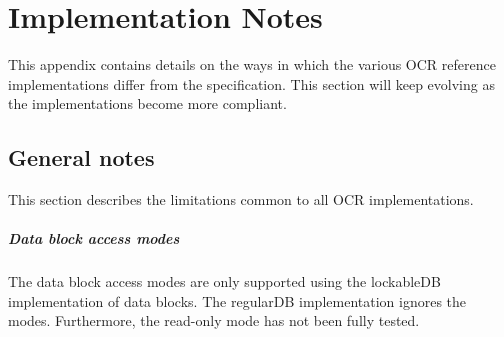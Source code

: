 %

\chapter{Implementation Notes}
\label{chap:ImplementationNotes}
\label{chap:Appendix C}
This appendix contains details on the ways in which the various OCR
reference implementations differ from the specification. This section
will keep evolving as the implementations become more compliant.
\section{General notes}
This section describes the limitations common to all OCR
implementations.
%
\paragraph*{Data block access modes}
The data block access modes are only supported using the {\code
  lockableDB} implementation of data blocks. The {\code regularDB}
implementation ignores the modes. Furthermore, the read-only mode has
not been fully tested.
